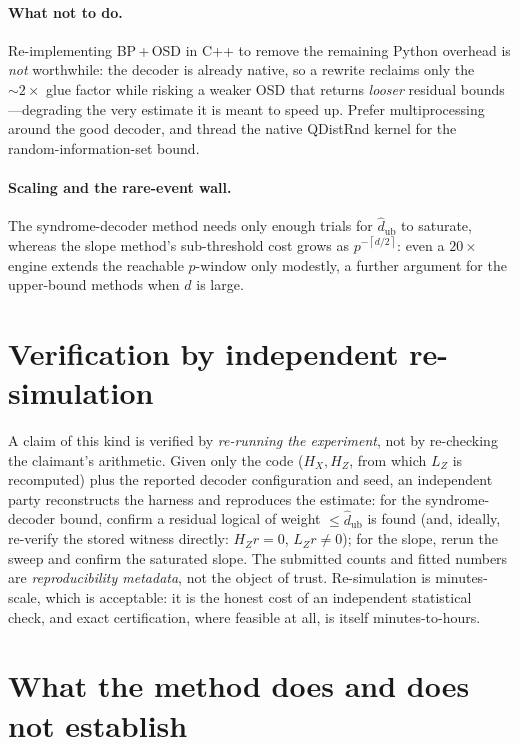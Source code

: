 \documentclass[11pt]{article}
\newcommand{\HX}{H_X}
\newcommand{\HZ}{H_Z}
\newcommand{\dub}{\hat d_{\mathrm{ub}}}
\newcommand{\ceil}[1]{\left\lceil #1 \right\rceil}
\begin{document}
\paragraph{What not to do.} Re-implementing BP\,+\,OSD in C++ to remove the
remaining Python overhead is \emph{not} worthwhile: the decoder is already native,
so a rewrite reclaims only the $\sim2\times$ glue factor while risking a weaker OSD
that returns \emph{looser} residual bounds---degrading the very estimate it is
meant to speed up. Prefer multiprocessing around the good decoder, and thread the
native QDistRnd kernel for the random-information-set bound.

\paragraph{Scaling and the rare-event wall.} The syndrome-decoder method needs only
enough trials for $\dub$ to saturate, whereas the slope method's sub-threshold cost
grows as $p^{-\ceil{d/2}}$: even a $20\times$ engine extends the reachable $p$-window
only modestly, a further argument for the upper-bound methods when $d$ is large.

\section{Verification by independent re-simulation}
\label{sec:verify}

A claim of this kind is verified by \emph{re-running the experiment}, not by
re-checking the claimant's arithmetic. Given only the code ($\HX,\HZ$, from which
$L_Z$ is recomputed) plus the reported decoder configuration and seed, an
independent party reconstructs the harness and reproduces the estimate:
for the syndrome-decoder bound, confirm a residual logical of weight $\le\dub$ is
found (and, ideally, re-verify the stored witness directly: $\HZ r=0$,
$L_Z r\neq0$); for the slope, rerun the sweep and confirm the saturated slope. The
submitted counts and fitted numbers are \emph{reproducibility metadata}, not the
object of trust. Re-simulation is minutes-scale, which is acceptable: it is the
honest cost of an independent statistical check, and exact certification, where
feasible at all, is itself minutes-to-hours.

\section{What the method does and does not establish}
\label{sec:caveats}
\end{document}
